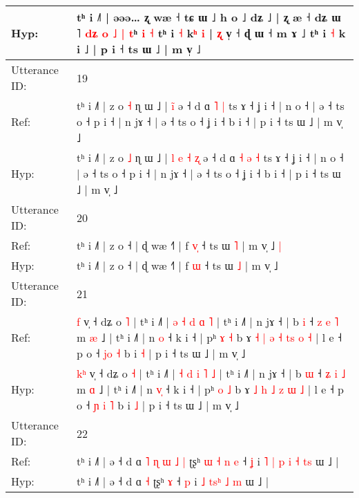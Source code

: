 \documentclass[10pt]{article}
\DeclareRobustCommand{\hl}[1]{{\textcolor{red}{#1}}}
\begin{document}
\begin{longtable}{ll}
 \\
Hyp: & tʰ i ˩˥ | əəə…\hl{}\hl{} ʐ wæ ˧ tɕ ɯ ˩ h o ˩ dʑ\hl{}\hl{} ˩ | ʐ \hl{}æ ˧ dʑ ɯ \hl{}˥ \hl{d}\hl{ʑ} \hl{o} \hl{˩} \hl{|} \hl{t}ʰ \hl{i} \hl{˧} tʰ i \hl{˧} k\hl{}\hl{ʰ} \hl{i} | \hl{ʐ} v̩ ˧\hl{}\hl{} ɖ ɯ ˧ m ɤ ˩ tʰ i \hl{˧} k i ˩ | p i ˧ ts ɯ ˩ | m v̩ ˩
 \\
\midrule
Utterance ID: & 19 \\
Ref: & tʰ i ˩˥ | z o \hl{˧} ɳ ɯ ˩ |\hl{}\hl{}\hl{}\hl{} \hl{}\hl{i}\hl{̃} ə ˧ d ɑ\hl{}\hl{} \hl{˥} \hl{|} ts ɤ ˧ ʝ i ˧ | n o ˧ | ə ˧ ts o ˧ p i ˧ | n jɤ ˧ | ə ˧ ts o ˧ ʝ i ˧ b i ˧ | p i ˧ ts ɯ ˩ | m v̩ ˩
 \\
Hyp: & tʰ i ˩˥ | z o \hl{˩} ɳ ɯ ˩ |\hl{ }\hl{l}\hl{ }\hl{e} \hl{˧}\hl{ }\hl{ʐ} ə ˧ d ɑ\hl{ }\hl{˧} \hl{ə} \hl{˧} ts ɤ ˧ ʝ i ˧ | n o ˧ | ə ˧ ts o ˧ p i ˧ | n jɤ ˧ | ə ˧ ts o ˧ ʝ i ˧ b i ˧ | p i ˧ ts ɯ ˩ | m v̩ ˩
 \\
\midrule
Utterance ID: & 20 \\
Ref: & tʰ i ˩˥ | z o ˧ | ɖ wæ ˧˥ | f \hl{v}\hl{̩} ˧ ts ɯ \hl{˥} | m v̩ ˩\hl{ }\hl{|}
 \\
Hyp: & tʰ i ˩˥ | z o ˧ | ɖ wæ ˧˥ | f \hl{}\hl{ɯ} ˧ ts ɯ \hl{˩} | m v̩ ˩\hl{}\hl{}
 \\
\midrule
Utterance ID: & 21 \\
Ref: & \hl{}\hl{f} v̩ ˧ dʑ o \hl{˥} | tʰ i ˩˥ | \hl{ə} \hl{˧} \hl{d} \hl{ɑ} \hl{˥} | tʰ i ˩˥ | n jɤ ˧ | b \hl{i} ˧ \hl{z} \hl{e} \hl{˥} m \hl{æ} ˩ | tʰ i ˩˥ | n \hl{}\hl{o} ˧ k i ˧ | pʰ \hl{ɤ} \hl{˧} b ɤ\hl{ }\hl{˧} \hl{|} \hl{ə} \hl{˧} \hl{t}\hl{s} \hl{o} \hl{˧} | l e ˧ p o ˧ \hl{}\hl{j}\hl{o} \hl{˧} b i \hl{˧} | p i ˧ ts ɯ ˩ | m v̩ ˩
 \\
Hyp: & \hl{k}\hl{ʰ} v̩ ˧ dʑ o \hl{˧} | tʰ i ˩˥ | \hl{˧} \hl{d} \hl{i} \hl{˥} \hl{˩} | tʰ i ˩˥ | n jɤ ˧ | b \hl{ɯ} ˧ \hl{ʑ} \hl{i} \hl{˩} m \hl{ɑ} ˩ | tʰ i ˩˥ | n \hl{v}\hl{̩} ˧ k i ˧ | pʰ \hl{o} \hl{˩} b ɤ\hl{}\hl{} \hl{˩} \hl{h} \hl{˩} \hl{}\hl{z} \hl{ɯ} \hl{˩} | l e ˧ p o ˧ \hl{ɲ}\hl{ }\hl{i} \hl{˥} b i \hl{˩} | p i ˧ ts ɯ ˩ | m v̩ ˩
 \\
\midrule
Utterance ID: & 22 \\
Ref: & tʰ i ˩˥ | ə ˧ d ɑ\hl{ }\hl{˥}\hl{ }\hl{ɳ}\hl{ }\hl{ɯ}\hl{ }\hl{˩} \hl{|} ʈʂʰ\hl{ }\hl{ɯ}\hl{ }\hl{˧}\hl{ }\hl{n} \hl{e} ˧ \hl{ʝ} i\hl{ }\hl{˥} \hl{|} \hl{p}\hl{ }\hl{i} \hl{˧} \hl{t}\hl{s} ɯ ˩ |
 \\
Hyp: & tʰ i ˩˥ | ə ˧ d ɑ\hl{}\hl{}\hl{}\hl{}\hl{}\hl{}\hl{}\hl{} \hl{˧} ʈʂʰ\hl{}\hl{}\hl{}\hl{}\hl{}\hl{} \hl{ɤ} ˧ \hl{p} i\hl{}\hl{} \hl{˩} \hl{t}\hl{s}\hl{ʰ} \hl{˩} \hl{}\hl{m} ɯ ˩ |
 \\

\end{longtable}
\end{document}
